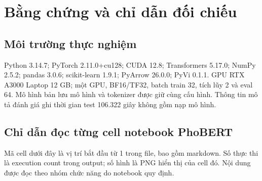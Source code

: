 \chapter{Bằng chứng và chỉ dẫn đối chiếu}

\section{Môi trường thực nghiệm}
Python 3.14.7; PyTorch 2.11.0+cu128; CUDA 12.8; Transformers 5.17.0; NumPy 2.5.2; pandas 3.0.6; scikit-learn 1.9.1; PyArrow 26.0.0; PyVi 0.1.1. GPU RTX A3000 Laptop 12 GB; một GPU, BF16/TF32, batch train 32, tích lũy 2 và eval 64. Mô hình bản lưu mô hình và tokenizer được giữ cùng cấu hình. Thông tin mô tả đánh giá ghi thời gian test 106.322 giây không gồm nạp mô hình.

\section{Chỉ dẫn đọc từng cell notebook PhoBERT}
Mã cell dưới đây là vị trí bắt đầu từ 1 trong file, bao gồm markdown. Số thực thi là execution count trong output; số hình là PNG hiển thị của cell đó. Nội dung được đọc theo nhóm chức năng do notebook quy định.
